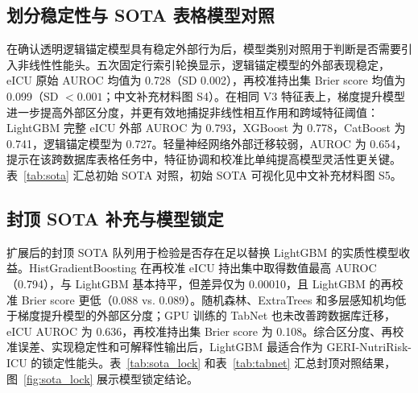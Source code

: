 \documentclass[11pt]{ctexart}
\begin{document}
\subsection{划分稳定性与 SOTA 表格模型对照}
在确认透明逻辑锚定模型具有稳定外部行为后，模型类别对照用于判断是否需要引入非线性性能头。五次固定行索引轮换显示，逻辑锚定模型的外部表现稳定，eICU 原始 AUROC 均值为 0.728（SD 0.002），再校准持出集 Brier score 均值为 0.099（SD $<0.001$；中文补充材料图 S4）。在相同 V3 特征表上，梯度提升模型进一步提高外部区分度，并更有效地捕捉非线性相互作用和跨域特征阈值：LightGBM 完整 eICU 外部 AUROC 为 0.793，XGBoost 为 0.778，CatBoost 为 0.741，逻辑锚定模型为 0.727。轻量神经网络外部迁移较弱，AUROC 为 0.654，提示在该跨数据库表格任务中，特征协调和校准比单纯提高模型灵活性更关键。表~\ref{tab:sota} 汇总初始 SOTA 对照，初始 SOTA 可视化见中文补充材料图 S5。

\begin{table}[htbp]
\centering
\caption{相同 MIMIC-IV 开发集与 eICU-CRD 外部验证集上的 SOTA 表格模型对照。粗体表示该列显示结果中的最优值；Brier 和 ECE 越低越好。}
\label{tab:sota}
\noindent{}
\end{table}

\subsection{封顶 SOTA 补充与模型锁定}
扩展后的封顶 SOTA 队列用于检验是否存在足以替换 LightGBM 的实质性模型收益。HistGradientBoosting 在再校准 eICU 持出集中取得数值最高 AUROC（0.794），与 LightGBM 基本持平，但差异仅为 0.00010，且 LightGBM 的再校准 Brier score 更低（0.088 vs. 0.089）。随机森林、ExtraTrees 和多层感知机均低于梯度提升模型的外部区分度；GPU 训练的 TabNet 也未改善跨数据库迁移，eICU AUROC 为 0.636，再校准持出集 Brier score 为 0.108。综合区分度、再校准误差、实现稳定性和可解释性输出后，LightGBM 最适合作为 GERI-NutriRisk-ICU 的锁定性能头。表~\ref{tab:sota_lock} 和表~\ref{tab:tabnet} 汇总封顶对照结果，图~\ref{fig:sota_lock} 展示模型锁定结论。
\end{document}
